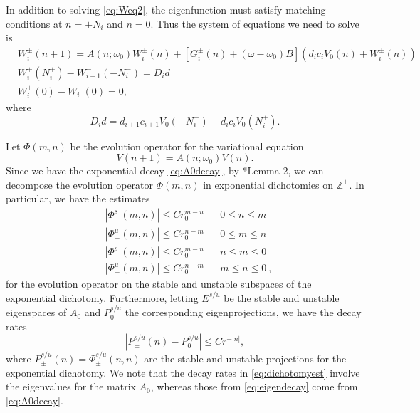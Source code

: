 \documentclass[12pt,reqno]{amsart}
\def\Z{{\mathbb Z}}
\begin{document}
In addition to solving \cref{eq:Weq2}, the eigenfunction must satisfy matching conditions at $n = \pm N_i$ and $n = 0$. Thus the system of equations we need to solve is
\begin{equation}\label{eq:eigWsystem1}
\begin{aligned}
& W_i^\pm(n+1)
= A(n; \omega_0) W_i^\pm(n) + [G_i^\pm(n) + (\omega - \omega_0) B](d_i c_i V_0(n) + W_i^\pm(n))\\
& W_i^+(N_i^+) - W_{i+1}^-(-N_i^-) = D_i d \\
& W_i^+(0) - W_i^-(0) = 0,
\end{aligned}
\end{equation}
where
\begin{equation}\label{defDid}
D_i d = d_{i+1} c_{i+1} V_0(-N_i^-) - d_i c_i V_0(N_i^+).
\end{equation}

Let $\Phi(m, n)$ be the evolution operator for the variational equation 
\begin{equation}\label{eq:vareq1}
	V(n+1) = A(n; \omega_0) V(n).
\end{equation}
Since we have the exponential decay \cref{eq:A0decay}, by \cite{Parker2020}*{Lemma 2}, we can decompose the evolution operator $\Phi(m, n)$ in exponential dichotomies on $\Z^\pm$. In particular, we have the estimates 
\begin{equation}\label{eq:dichotomyest}
\begin{aligned}
&|\Phi_+^s(m, n)| \leq C r_0^{m - n} && 0 \leq n \leq m \\
&|\Phi_+^u(m, n)| \leq C r_0^{n - m} && 0 \leq m \leq n \\
&|\Phi_-^s(m, n)| \leq C r_0^{m - n} && n \leq m \leq 0 \\
&|\Phi_-^u(m, n)| \leq C r_0^{n - m} && m \leq n \leq 0 \:,
\end{aligned}
\end{equation}
for the evolution operator on the stable and unstable subspaces of the exponential dichotomy. Furthermore, letting $E^{s/u}$ be the stable and unstable eigenspaces of $A_0$ and $P_0^{s/u}$ the corresponding eigenprojections, we have the decay rates
\begin{equation}\label{eq:eigendecay}
	|P_\pm^{s/u}(n) - P_0^{s/u}| \leq C r^{-|n|},
\end{equation}
where $P_\pm^{s/u}(n) = \Phi_\pm^{s/u}(n, n)$ are the stable and unstable projections for the exponential dichotomy. We note that the decay rates in \cref{eq:dichotomyest} involve the eigenvalues for the matrix $A_0$, whereas those from \cref{eq:eigendecay} come from \cref{eq:A0decay}. 
\end{document}

